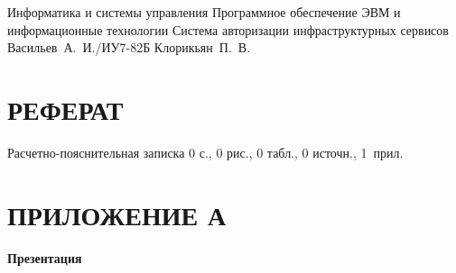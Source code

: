 \documentclass{bmstu}
\begin{document}
\makethesistitle
    {Информатика и системы управления}
    {Программное обеспечение ЭВМ и информационные технологии}
    {Система авторизации инфраструктурных сервисов}
    {Васильев~А.~И./ИУ7-82Б}
    {Клорикьян~П.~В.}
    {}
    { }

\setcounter{page}{5}

{\centering \chapter*{РЕФЕРАТ}}

Расчетно-пояснительная записка 0 с., 0 рис., 0 табл., 0 источн., \mbox{1 прил.}

\pagebreak
\maketableofcontents




{\centering {\center\printbibliography[title=СПИСОК ИСПОЛЬЗОВАННЫХ ИСТОЧНИКОВ]}}

{\centering \chapter*{ПРИЛОЖЕНИЕ А}}
\centering \textbf{Презентация}
\end{document}
